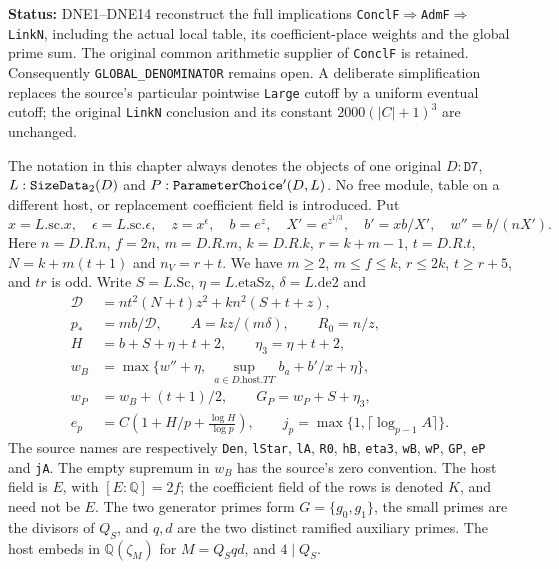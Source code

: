 \documentclass[11pt,a4paper]{article}
\numberwithin{equation}{section}
\theoremstyle{remark}\newtheorem{remark}[theorem]{Remark}
\newcommand{\status}[1]{\textbf{Status:} #1}
\begin{document}
\status{DNE1--DNE14 reconstruct the full implications
\texttt{Concl\allowbreak F}$\Rightarrow$\texttt{Adm\allowbreak F}$\Rightarrow$
\texttt{Link\allowbreak N}, including the actual local table, its coefficient-place
weights and the global prime sum.  The original common arithmetic
supplier of \texttt{Concl\allowbreak F} is retained.  Consequently
\texttt{GLOBAL\_\allowbreak DENOMINATOR} remains open.  A deliberate simplification
replaces the source's particular pointwise \texttt{Large} cutoff by a
uniform eventual cutoff; the original \texttt{Link\allowbreak N} conclusion and
its constant $2000(|C|+1)^3$ are unchanged.}

The notation in this chapter always denotes the objects of one original
$D:\texttt{D7}$, $L:\texttt{Size\allowbreak Data}_2(D)$ and
$P:\texttt{Parameter\allowbreak Choice}'(D,L)$.  No free module, table on a different
host, or replacement coefficient field is introduced.  Put
\[
 x=L.\mathrm{sc}.x,\quad \epsilon=L.\mathrm{sc}.\epsilon,
 \quad z=x^\epsilon,\quad b=e^z,\quad X'=e^{z^{1/3}},
 \quad b'=xb/X',\quad w''=b/(nX').                         \tag{DNE.1}
\]
Here $n=D.R.n$, $f=2n$, $m=D.R.m$, $k=D.R.k$,
$r=k+m-1$, $t=D.R.t$, $N=k+m(t+1)$ and $n_V=r+t$.
We have $m\ge2$, $m\le f\le k$, $r\le2k$, $t\ge r+5$,
and $tr$ is odd.  Write $S=L.\mathrm{Sc}$, $\eta=L.\mathrm{etaSz}$,
$\delta=L.\mathrm{de2}$ and
\[
\begin{split}
 \mathcal D&=nt^2(N+t)z^2+kn^2(S+t+z),\\
 p_*&=mb/\mathcal D,\qquad A=kz/(m\delta),\qquad R_0=n/z,\\
 H&=b+S+\eta+t+2,\qquad \eta_3=\eta+t+2,\\
 w_B&=\max\{w''+\eta,\ \sup_{a\in D.\mathrm{host}.TT}b_a+b'/x+\eta\},\\
 w_P&=w_B+(t+1)/2,\qquad G_P=w_P+S+\eta_3,\\
 e_p&=C\left(1+H/p+\frac{\log H}{\log p}\right),\qquad
 j_p=\max\{1,\lceil\log_{p-1}A\rceil\}.
\end{split}                                                       \tag{DNE.2}
\]
The source names are respectively \texttt{Den}, \texttt{l\allowbreak Star},
\texttt{l\allowbreak A}, \texttt{R0}, \texttt{h\allowbreak B}, \texttt{eta3},
\texttt{w\allowbreak B}, \texttt{w\allowbreak P}, \texttt{GP}, \texttt{e\allowbreak P} and \texttt{j\allowbreak A}.
The empty supremum in $w_B$ has the source's zero convention.
The host field is $E$, with $[E:\mathbb Q]=2f$; the coefficient
field of the rows is denoted $K$, and need not be $E$.
The two generator primes form $G=\{g_0,g_1\}$, the small primes
are the divisors of $Q_S$, and $q,d$ are the two distinct ramified
auxiliary primes.  The host embeds in
$\mathbb Q(\zeta_M)$ for $M=Q_Sqd$, and $4\mid Q_S$.
\end{document}
